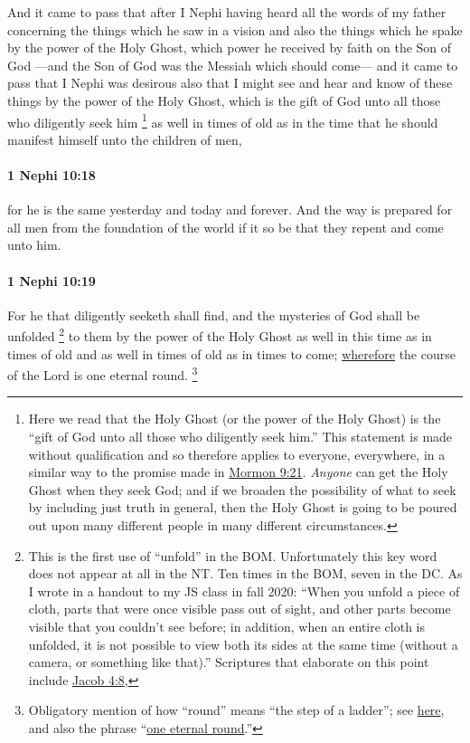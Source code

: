 			And it came to pass that after I Nephi having heard all the words of my father
			concerning the things which he saw in a vision
			and also the things which he spake by the power of the Holy Ghost,
			which power he received by faith on the Son of God
			---and the Son of God was the Messiah which should come---
			and it came to pass that I Nephi was desirous also
			that I might see and hear and know of these things by the power of the Holy Ghost,
			which is the gift of God unto all those who diligently seek him%
				\footnote{%
					\label{1NEPHI-10-17-NOTE-gift}%
					Here we read that the Holy Ghost (or the power of the Holy Ghost) is the ``gift of God unto all those who diligently seek him.'' This statement is made without qualification and so therefore applies to everyone, everywhere, in a similar way to the promise made in \hyperref[MORMON-9-21]{Mormon 9:21}. \textit{Anyone} can get the Holy Ghost when they seek God; and if we broaden the possibility of what to seek by including just truth in general, then the Holy Ghost is going to be poured out upon many different people in many different circumstances.
					}
			as well in times of old
			as in the time that he should manifest himself unto the children of men,

		\paragraph{1 Nephi 10:18} %
			\label{1NEPHI-10-18}

			for he is the same yesterday and today and forever.
			And the way is prepared for all men from the foundation of the world
			if it so be that they repent and come unto him.

		\paragraph{1 Nephi 10:19} %
			\label{1NEPHI-10-19}

			For he that diligently seeketh shall find,
			and the mysteries of God shall be unfolded%
				\footnote{%
					This is the first use of ``unfold'' in the BOM. Unfortunately this key word does not appear at all in the NT. Ten times in the BOM, seven in the DC. As I wrote in a handout to my JS class in fall 2020: ``When you unfold a piece of cloth, parts that were once visible pass out of sight, and other parts become visible that you couldn't see before; in addition, when an entire cloth is unfolded, it is not possible to view both its sides at the same time (without a camera, or something like that).'' Scriptures that elaborate on this point include \hyperref[JACOB-4-8]{Jacob 4:8}, 
					}
			to them by the power of the Holy Ghost
			as well in this time as in times of old
			and as well in times of old as in times to come;
			\hyperref[WHEREFORE]{wherefore} the course of the Lord is one eternal round.%
			\footnote{%
				Obligatory mention of how ``round'' means ``the step of a ladder''; see \hyperref[ROUND-1828]{here}, and also the phrase ``\hyperref[ROUND-PHRASES]{one eternal round}.''
				} 


